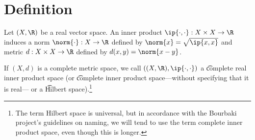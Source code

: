 

\section*{Definition}

Let $(X, \R )$ be a real vector space. An inner product $\ip{\cdot ,\cdot }: X\times  X \to \R $ induces a norm $\norm{\cdot }: X \to \R $ defined by $\norm{x} = \sqrt{\ip{x,x}}$ and metric $d: X \times  X \to \R $ defined by $d(x, y) = \norm{x - y}$.

If $(X, d)$ is a complete metric space, we call $((X, \R ), \ip{\cdot ,\cdot })$ a \t{complete real inner product space} (or \t{complete inner product space}---without specifying that it is real--- or a \t{Hilbert space}).\footnote{The term Hilbert space is universal, but in accordance with the Bourbaki project's guidelines on naming, we will tend to use the term complete inner product space, even though this is longer.}

\blankpage